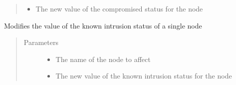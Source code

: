 \documentclass[letterpaper,10pt,english]{sphinxmanual}
\begin{document}
\begin{fulllineitems}
\begin{fulllineitems}
\begin{quote}
\begin{description}
\begin{itemize}
\item {}
\sphinxAtStartPar
{} \textendash{} The new value of the compromised status for the node

\end{itemize}

\end{description}\end{quote}

\end{fulllineitems}


\begin{fulllineitems}
\label{\detokenize{source/yawning_titan.envs.generic.core:yawning_titan.envs.generic.core.network_interface.NetworkInterface.update_single_node_known_intrusions}}
\sphinxAtStartPar
Modifies the value of the known intrusion status of a single node
\begin{quote}\begin{description}
\item[{Parameters}] \leavevmode\begin{itemize}
\item {}
\sphinxAtStartPar
{} \textendash{} The name of the node to affect

\item {}
\sphinxAtStartPar
{} \textendash{} The new value of the known intrusion status for the node

\end{itemize}

\end{description}\end{quote}

\end{fulllineitems}



\end{fulllineitems}
\end{document}
